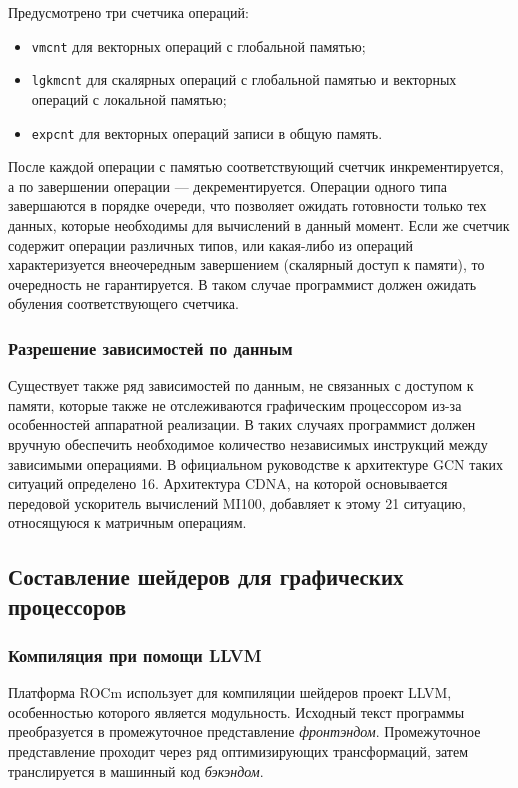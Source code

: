 \documentclass[a4paper,14pt]{extarticle}
\newenvironment{ul}{\begin{itemize}[noitemsep,topsep=0em]}{\end{itemize}\vspace{4mm}}
\begin{document}
Предусмотрено три счетчика операций:
\begin{ul}
\item \texttt{vmcnt} для векторных операций с глобальной памятью;
\item \texttt{lgkmcnt} для скалярных операций с глобальной памятью и векторных операций с локальной памятью;
\item \texttt{expcnt} для векторных операций записи в общую память.
\end{ul}

После каждой операции с памятью соответствующий счетчик инкрементируется, а по завершении
операции — декрементируется. Операции одного типа завершаются в порядке очереди, что
позволяет ожидать готовности только тех данных, которые необходимы для вычислений в данный
момент. Если же счетчик содержит операции различных типов, или какая-либо из операций
характеризуется внеочередным завершением (скалярный доступ к памяти), то очередность не гарантируется.
В таком случае программист должен ожидать обуления соответствующего счетчика.

\subsubsection{Разрешение зависимостей по данным}

Существует также ряд зависимостей по данным, не связанных с доступом к памяти,
которые также не отслеживаются графическим процессором из-за особенностей аппаратной реализации.
В таких случаях программист должен вручную обеспечить необходимое количество независимых
инструкций между зависимыми операциями. В официальном руководстве к архитектуре GCN
таких ситуаций определено 16\cite{vega-isa}. Архитектура CDNA, на которой основывается передовой ускоритель
вычислений MI100, добавляет к этому 21 ситуацию, относящуюся к матричным операциям\cite{cdna-isa}.

\subsection{Составление шейдеров для графических процессоров}

\subsubsection{Компиляция при помощи LLVM}

Платформа ROCm использует для компиляции шейдеров проект LLVM, особенностью
которого является модульность. Исходный текст программы преобразуется
в промежуточное представление \textit{фронтэндом}. Промежуточное представление
проходит через ряд оптимизирующих трансформаций, затем транслируется в машинный код
\textit{бэкэндом}.
\end{document}
